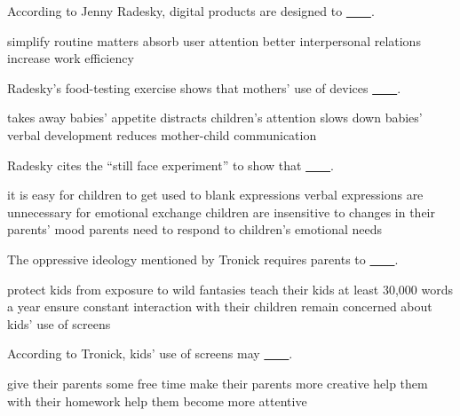 \item According to Jenny Radesky, digital products are designed to \uline{~~~~}.
\begin{tasks}
	\task simplify routine matters
	\task absorb user attention
	\task better interpersonal relations
	\task increase work efficiency
\end{tasks}
\item Radesky's food-testing exercise shows that mothers' use of devices \uline{~~~~}.
\begin{tasks}
	\task takes away babies' appetite
	\task distracts children's attention
	\task slows down babies' verbal development
	\task reduces mother-child communication
\end{tasks}
\item Radesky cites the ``still face experiment'' to show that \uline{~~~~}.
\begin{tasks}
	\task it is easy for children to get used to blank expressions
	\task verbal expressions are unnecessary for emotional exchange
	\task children are insensitive to changes in their parents' mood
	\task parents need to respond to children's emotional needs
\end{tasks}
\item The oppressive ideology mentioned by Tronick requires parents to \uline{~~~~}.
\begin{tasks}
	\task protect kids from exposure to wild fantasies
	\task teach their kids at least 30,000 words a year
	\task ensure constant interaction with their children
	\task remain concerned about kids' use of screens
\end{tasks}
\item According to Tronick, kids' use of screens may \uline{~~~~}.
\begin{tasks}
	\task give their parents some free time
	\task make their parents more creative
	\task help them with their homework
	\task help them become more attentive
\end{tasks}